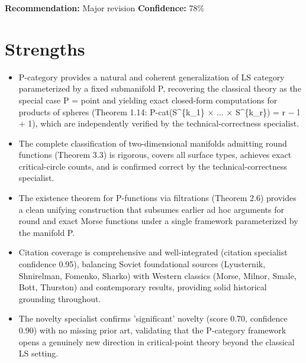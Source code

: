 \documentclass[11pt]{article}
\begin{document}
\textbf{Recommendation:} Major revision \quad \textbf{Confidence:} 78\%\\

\section*{Strengths}
\begin{itemize}[leftmargin=*]
  \item P-category provides a natural and coherent generalization of LS category parameterized by a fixed submanifold P, recovering the classical theory as the special case P = point and yielding exact closed-form computations for products of spheres (Theorem 1.14: P-cat(S\^{}\{k\_1\} \ensuremath{\times} ... \ensuremath{\times} S\^{}\{k\_r\}) = r \ensuremath{-} l + 1), which are independently verified by the technical-correctness specialist.
  \item The complete classification of two-dimensional manifolds admitting round functions (Theorem 3.3) is rigorous, covers all surface types, achieves exact critical-circle counts, and is confirmed correct by the technical-correctness specialist.
  \item The existence theorem for P-functions via filtrations (Theorem 2.6) provides a clean unifying construction that subsumes earlier ad hoc arguments for round and exact Morse functions under a single framework parameterized by the manifold P.
  \item Citation coverage is comprehensive and well-integrated (citation specialist confidence 0.95), balancing Soviet foundational sources (Lyusternik, Shnirelman, Fomenko, Sharko) with Western classics (Morse, Milnor, Smale, Bott, Thurston) and contemporary results, providing solid historical grounding throughout.
  \item The novelty specialist confirms 'significant' novelty (score 0.70, confidence 0.90) with no missing prior art, validating that the P-category framework opens a genuinely new direction in critical-point theory beyond the classical LS setting.
\end{itemize}
\end{document}
